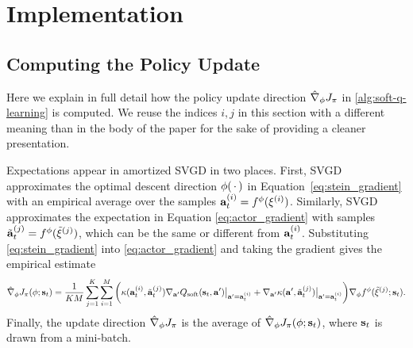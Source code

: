 \section{Implementation}
\label{app:implementation}

\subsection{Computing the Policy Update}
\label{app:compute_actor_update}

Here we explain in full detail how the policy update direction $\hat\nabla_{\phi}J_\pi$ in \autoref{alg:soft-q-learning} is computed. We reuse the indices $i,j$ in this section with a different meaning than in the body of the paper for the sake of providing a cleaner presentation.

Expectations appear in amortized SVGD in two places. First, SVGD approximates the optimal descent direction $\phi(\,\cdot\,)$ in Equation~\eqref{eq:stein_gradient} with an empirical average over the samples ${\mathbf{a}_t^{(i)}} = f^{\phi}(\mathbf{\xi}^{(i)})$. Similarly, SVGD approximates the expectation in Equation \eqref{eq:actor_gradient} with samples ${\tilde{\mathbf{a}}_t^{(j)}} = f^{\phi}(\tilde{\xi}^{(j)})$, which can be the same or different from ${\mathbf{a}_t^{(i)}}$. Substituting \eqref{eq:stein_gradient} into \eqref{eq:actor_gradient} and taking the gradient gives the empirical estimate
\begin{equation}
\hat\nabla_{\phi} J_\pi ({\phi}; {\mathbf{s}_t}) = \frac{1}{KM}\sum_{j=1}^K\sum_{i=1}^M\bigg( \kappa({\mathbf{a}_t^{(i)}}, {\tilde{\mathbf{a}}_t^{(j)}})\nabla_{\mathbf{a}'} Q_\mathrm{soft}({\mathbf{s}_t}, \mathbf{a}')\big|_{\mathbf{a}' = {\mathbf{a}_t^{(i)}}}\bigg.\notag \bigg.+ \nabla_{\mathbf{a}'}\kappa(\mathbf{a}', {\tilde{\mathbf{a}}_t^{(j)}})\big|_{\mathbf{a}'={\mathbf{a}_t^{(i)}}}\bigg)\nabla_{\phi} f^{\phi}(\tilde{\xi}^{(j)};{\mathbf{s}_t}).
\label{eq:stein_approx_grad}
\end{equation}
Finally, the update direction $\hat\nabla_{\phi}J_\pi$ is the average of $\hat\nabla_{\phi} J_\pi ({\phi}; {\mathbf{s}_t})$, where ${\mathbf{s}_t}$ is drawn from a mini-batch.



